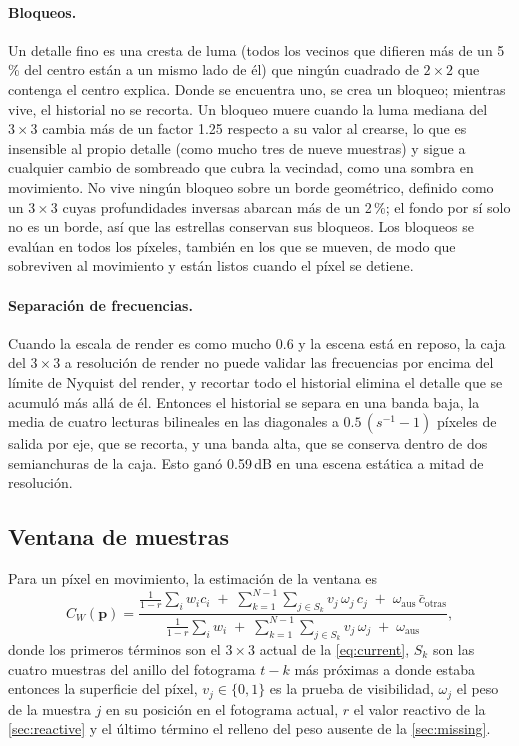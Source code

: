 \documentclass[11pt,a4paper]{article}
\newcommand{\vect}[1]{\mathbf{#1}}
\begin{document}
\paragraph{Bloqueos.} Un detalle fino es una cresta de luma (todos los vecinos que difieren más de un 5\,\% del centro están a un mismo lado de él) que ningún cuadrado de $2\times2$ que contenga el centro explica. Donde se encuentra uno, se crea un bloqueo; mientras vive, el historial no se recorta. Un bloqueo muere cuando la luma mediana del $3\times3$ cambia más de un factor 1.25 respecto a su valor al crearse, lo que es insensible al propio detalle (como mucho tres de nueve muestras) y sigue a cualquier cambio de sombreado que cubra la vecindad, como una sombra en movimiento. No vive ningún bloqueo sobre un borde geométrico, definido como un $3\times3$ cuyas profundidades inversas abarcan más de un 2\,\%; el fondo por sí solo no es un borde, así que las estrellas conservan sus bloqueos. Los bloqueos se evalúan en todos los píxeles, también en los que se mueven, de modo que sobreviven al movimiento y están listos cuando el píxel se detiene.

\paragraph{Separación de frecuencias.} Cuando la escala de render es como mucho 0.6 y la escena está en reposo, la caja del $3\times3$ a resolución de render no puede validar las frecuencias por encima del límite de Nyquist del render, y recortar todo el historial elimina el detalle que se acumuló más allá de él. Entonces el historial se separa en una banda baja, la media de cuatro lecturas bilineales en las diagonales a $0.5\,(s^{-1}-1)$ píxeles de salida por eje, que se recorta, y una banda alta, que se conserva dentro de dos semianchuras de la caja. Esto ganó 0.59\,dB en una escena estática a mitad de resolución.

\subsection{Ventana de muestras}
\label{sec:window}

Para un píxel en movimiento, la estimación de la ventana es
\begin{equation}
C_W(\vect p) = \frac{\frac{1}{1-r}\sum_{i} w_i c_i \;+\; \sum_{k=1}^{N-1} \sum_{j\in S_k} v_j\, \omega_j\, c_j \;+\; \omega_{\mathrm{aus}}\, \bar c_{\mathrm{otras}}}{\frac{1}{1-r}\sum_i w_i \;+\; \sum_{k=1}^{N-1}\sum_{j\in S_k} v_j\, \omega_j \;+\; \omega_{\mathrm{aus}}},
\label{eq:window}
\end{equation}
donde los primeros términos son el $3\times3$ actual de la \cref{eq:current}, $S_k$ son las cuatro muestras del anillo del fotograma $t-k$ más próximas a donde estaba entonces la superficie del píxel, $v_j\in\{0,1\}$ es la prueba de visibilidad, $\omega_j$ el peso de la muestra $j$ en su posición en el fotograma actual, $r$ el valor reactivo de la \cref{sec:reactive} y el último término el relleno del peso ausente de la \cref{sec:missing}.
\end{document}
